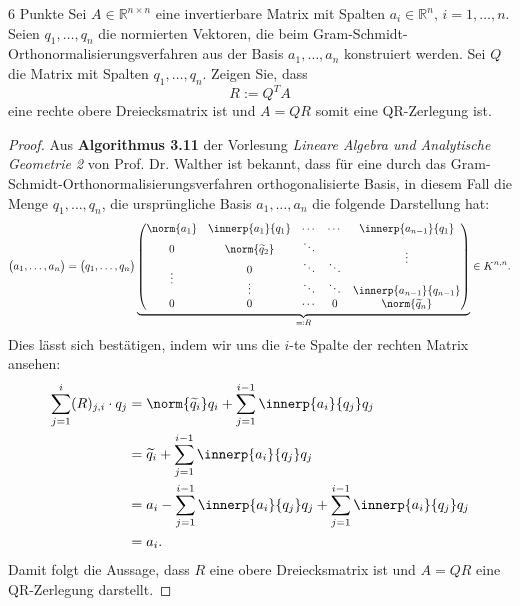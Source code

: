 \documentclass{problemset}
\begin{document}
\begin{problem}{6 Punkte}
Sei \( A \in \mathbb{R}^{n \times n} \) eine invertierbare Matrix mit Spalten
\( a_i \in \mathbb{R}^n, \, i = 1, \ldots, n \). Seien \( q_1, \ldots, q_n \)
die normierten Vektoren, die beim Gram-Schmidt-Orthonormalisierungsverfahren
aus der Basis \( a_1, \ldots, a_n \) konstruiert werden. Sei \( Q \) die Matrix
mit Spalten \( q_1, \ldots, q_n \). Zeigen Sie, dass
\[
    R := Q^T A
\]
eine rechte obere Dreiecksmatrix ist und \( A = QR \) somit eine QR-Zerlegung
  ist.

\begin{proof}
    Aus \textbf{Algorithmus 3.11} der Vorlesung \emph{Lineare Algebra und
        Analytische Geometrie 2} von Prof. Dr. Walther \cite{walther2024} ist
    bekannt, dass für eine durch das Gram-Schmidt-Orthonormalisierungsverfahren
    orthogonalisierte Basis, in diesem Fall die Menge \( q_1, \ldots, q_n \),
    die ursprüngliche Basis \( a_1, \ldots, a_n \) die folgende Darstellung
    hat:
    \begin{equation*}
        \begin{pmatrix} a_1, \ldots, a_n \end{pmatrix}
        = \begin{pmatrix} q_1, \ldots, q_n \end{pmatrix}
        \underbrace{%
            \begin{pmatrix}
                \norm{a_1}              & \innerp{a_1}{q_1}      & \cdots & \cdots & \innerp{a_{n-1}}{q_1}     \\
                0                       & \norm{\widetilde{q}_2} & \ddots &        & \multirow{2}{*}{\vdots}   \\
                \multirow{2}{*}{\vdots} & 0                      & \ddots & \ddots &                           \\
                                        & \vdots                 & \ddots & \ddots & \innerp{a_{n-1}}{q_{n-1}} \\
                0                       & 0                      & \cdots & 0      & \norm{\widetilde{q}_n}
            \end{pmatrix}
        }_{\eqcolon R} \in K^{n,n}.
    \end{equation*}
    Dies lässt sich bestätigen, indem wir uns die $i$-te Spalte der rechten
    Matrix ansehen:
    \begin{align*}
        \sum_{j=1}^i (R)_{j,i} \cdot q_j
         & = \norm{\widetilde{q}_i} q_i + \sum_{j=1}^{i-1} \innerp{a_i}{q_j} q_j                  \\
         & = \widetilde{q}_i + \sum_{j=1}^{i-1} \innerp{a_i}{q_j} q_j                             \\
         & = a_i - \sum_{j=1}^{i-1}\innerp{a_i}{q_j} q_j + \sum_{j=1}^{i-1} \innerp{a_i}{q_j} q_j \\
         & = a_i.
    \end{align*}
    Damit folgt die Aussage, dass \(R\) eine obere Dreiecksmatrix ist und \(A =
    QR\) eine QR-Zerlegung darstellt.
\end{proof}


\end{problem}
\end{document}
